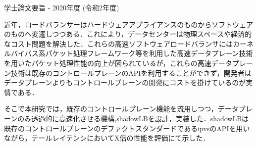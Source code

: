 学士論文要旨 - 2020年度 (令和2年度)
\begin{center}
\begin{large}
\end{large}
\end{center}

近年，ロードバランサーはハードウェアアプライアンスのものからソフトウェアのものへ変遷しつつある．これにより，データセンターは物理スペースや経済的なコスト問題を解決した．これらの高速ソフトウェアロードバランサにはカーネルバイパス系パケット処理フレームワーク等を利用した高速データプレーン技術を用いたパケット処理性能の向上が図られているが，これらの高速データプレーン技術は既存のコントロールプレーンのAPIを利用することができず，開発者はデータプレーンよりもコントロールプレーンの開発にコストを掛けているのが実情である．


そこで本研究では，既存のコントロールプレーン機能を流用しつつ，データプレーンのみ透過的に高速化させる機構,shadowLBを設計，実装した．shadowLBは既存のコントロールプレーンのデファクトスタンダードであるipvsのAPIを用いながら，テールレイテンシにおいてX倍の性能を評価にて示した．







